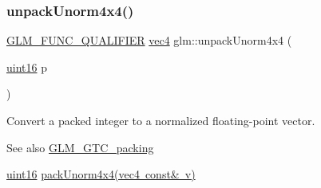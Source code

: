 \subsubsection{\texorpdfstring{unpack\+Unorm4x4()}{unpackUnorm4x4()}}
{\footnotesize\ttfamily \mbox{\hyperlink{setup_8hpp_a33fdea6f91c5f834105f7415e2a64407}{G\+L\+M\+\_\+\+F\+U\+N\+C\+\_\+\+Q\+U\+A\+L\+I\+F\+I\+ER}} \mbox{\hyperlink{group__core__types_ga5881b1b022d7fd1b7218f5916532dd02}{vec4}} glm\+::unpack\+Unorm4x4 (\begin{DoxyParamCaption}\item[{\mbox{\hyperlink{group__gtc__type__precision_gad8c2939e1fdd8e5828b31d95c52255d5}{uint16}}}]{p }\end{DoxyParamCaption})}

Convert a packed integer to a normalized floating-\/point vector.

\begin{DoxySeeAlso}{See also}
\mbox{\hyperlink{group__gtc__packing}{G\+L\+M\+\_\+\+G\+T\+C\+\_\+packing}} 

\mbox{\hyperlink{group__gtc__type__precision_gad8c2939e1fdd8e5828b31d95c52255d5}{uint16}} \mbox{\hyperlink{group__gtc__packing_gad493c9f130e91dd8a4b360b05dcea573}{pack\+Unorm4x4(vec4 const\& v)}} 
\end{DoxySeeAlso}
